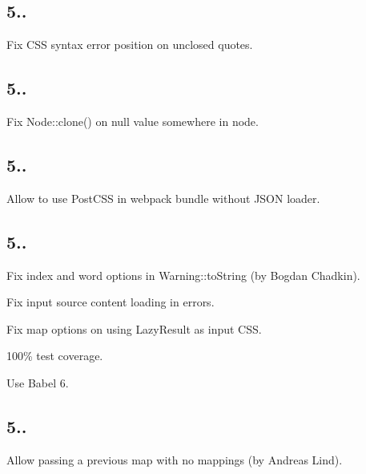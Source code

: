 \subsection*{5..}


\begin{DoxyItemize}
\item Fix C\+SS syntax error position on unclosed quotes.
\end{DoxyItemize}

\subsection*{5..}


\begin{DoxyItemize}
\item Fix {\ttfamily Node\+::clone()} on {\ttfamily null} value somewhere in node.
\end{DoxyItemize}

\subsection*{5..}


\begin{DoxyItemize}
\item Allow to use Post\+C\+SS in webpack bundle without J\+S\+ON loader.
\end{DoxyItemize}

\subsection*{5..}


\begin{DoxyItemize}
\item Fix {\ttfamily index} and {\ttfamily word} options in {\ttfamily Warning\+::to\+String} (by Bogdan Chadkin).
\item Fix input source content loading in errors.
\item Fix map options on using {\ttfamily Lazy\+Result} as input C\+SS.
\item 100\% test coverage.
\item Use Babel 6.
\end{DoxyItemize}

\subsection*{5..}


\begin{DoxyItemize}
\item Allow passing a previous map with no mappings (by Andreas Lind).
\end{DoxyItemize}

